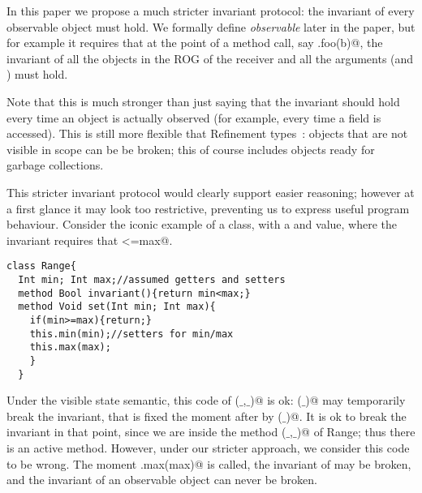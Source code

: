 In this paper we propose a much stricter invariant protocol: the invariant of every observable object must hold. We formally define \emph{observable} later in the paper, but for example it requires that
 at the point of a method call, say \Q@a.foo(b)@,
the invariant of all the objects in the ROG of the receiver and all
the arguments (\Q@a@ and \Q@b@) must hold.

Note that this is much stronger than just saying that the invariant
should hold every time an object is actually observed (for example,
every time a field is accessed).
This is still more flexible that Refinement types~\cite{?}: 
objects that are not visible in scope can be be broken;
this of course includes objects ready for garbage collections.

This stricter invariant protocol would clearly support easier reasoning; however 
at a first glance it may look too restrictive, preventing us to express useful program behaviour.
Consider the iconic example of a \Q@Range@ class, with a \Q@min@ and \Q@max@
value, where the invariant requires that \Q@min<=max@.
\begin{lstlisting}
class Range{
  Int min; Int max;//assumed getters and setters
  method Bool invariant(){return min<max;}
  method Void set(Int min; Int max){
    if(min>=max){return;}
    this.min(min);//setters for min/max
    this.max(max);
    }
  }
\end{lstlisting}
Under the visible state semantic, this code of \Q@set($\_$,$\_$)@ is ok:
\Q@min($\_$)@ may temporarily break the invariant, that is fixed the moment
after by \Q@max($\_$)@. It is ok to break the invariant in that point, since
we are inside the method \Q@set($\_$,$\_$)@ of Range; thus there is an active method.
However, under our stricter approach, we consider this code to be wrong. The moment
\Q@this.max(max)@ is called, the invariant of \Q@this@ may be broken, and
the invariant of an observable object can never be broken.

